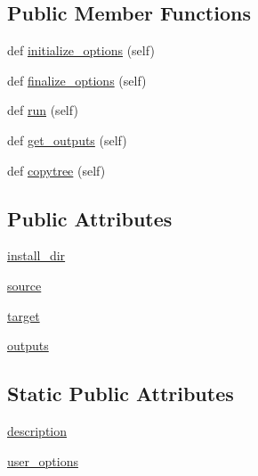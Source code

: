 \subsection*{Public Member Functions}
\begin{DoxyCompactItemize}
\item 
def \hyperlink{classsetuptools_1_1command_1_1install__egg__info_1_1install__egg__info_a5ab5aa08ad756bca1e88696028a02193}{initialize\+\_\+options} (self)
\item 
def \hyperlink{classsetuptools_1_1command_1_1install__egg__info_1_1install__egg__info_a09bf3e11da2fca8e1d598f5bfef28c6e}{finalize\+\_\+options} (self)
\item 
def \hyperlink{classsetuptools_1_1command_1_1install__egg__info_1_1install__egg__info_ab796e0cd113ca97b504d05f167ef3ea3}{run} (self)
\item 
def \hyperlink{classsetuptools_1_1command_1_1install__egg__info_1_1install__egg__info_a10f0717594f638c0e32504bb45968eb2}{get\+\_\+outputs} (self)
\item 
def \hyperlink{classsetuptools_1_1command_1_1install__egg__info_1_1install__egg__info_afb27066e412852b61f7d909f61512a15}{copytree} (self)
\end{DoxyCompactItemize}
\subsection*{Public Attributes}
\begin{DoxyCompactItemize}
\item 
\hyperlink{classsetuptools_1_1command_1_1install__egg__info_1_1install__egg__info_a9b2a77216c53098026b4ee151af956d2}{install\+\_\+dir}
\item 
\hyperlink{classsetuptools_1_1command_1_1install__egg__info_1_1install__egg__info_a6c41d54fa446a81a3662d7b06e3e04cc}{source}
\item 
\hyperlink{classsetuptools_1_1command_1_1install__egg__info_1_1install__egg__info_a4a124fe2c93cba2ffc46e4486919c9ce}{target}
\item 
\hyperlink{classsetuptools_1_1command_1_1install__egg__info_1_1install__egg__info_a3df3b274d8283585e615b94f8cb84305}{outputs}
\end{DoxyCompactItemize}
\subsection*{Static Public Attributes}
\begin{DoxyCompactItemize}
\item 
\hyperlink{classsetuptools_1_1command_1_1install__egg__info_1_1install__egg__info_ad4ba94ebf5c8bec6b3c3908d743a8538}{description}
\item 
\hyperlink{classsetuptools_1_1command_1_1install__egg__info_1_1install__egg__info_a1a9ef8a0aee00a934bc1b155d95b14fb}{user\+\_\+options}
\end{DoxyCompactItemize}


